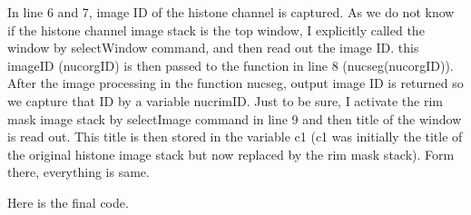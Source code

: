 In line 6 and 7, image ID of the histone channel is captured. As we do not know if the histone channel image stack is the top window, I explicitly called the window by selectWindow command, and then read out the image ID. this imageID (nucorgID) is then passed to the function in line 8 (nucseg(nucorgID)). After the image processing in the function nucseg, output image ID is returned so we capture that ID by a variable nucrimID. Just to be sure, I activate the rim mask image stack by selectImage command in line 9 and then title of the window is read out. This title is then stored in the variable c1 (c1 was initially the title of the original histone image stack but now replaced by the rim mask stack). Form there, everything is same.

Here is the final code.